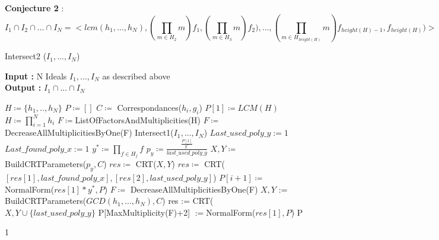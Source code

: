 \documentclass{article}
\begin{document}
\textbf{Conjecture 2} : \[I_{1}\cap I_{2}\cap\dots\cap I_{N} = <lcm(h_{1},\dots,h_{N}),(\prod_{m \in H_{2}} m)f_{1},(\prod_{m \in H_{3}} m)f_{2}),\dots,(\prod_{m \in H_{height(H)}} m)f_{height(H)-1},f_{height(H)})>\]








\begin{algorithm}
    \caption{Intersect2 ($I_{1},...,I_{N}$)}\label{alg:intersect-2-ideals-diff-gcd}
    \textbf{Input : } N Ideals $I_{1},...,I_{N}$ as described above \\
    \textbf{Output : }$I_{1} \cap ...\cap I_ {N}$
\begin{algorithmic}
    \State $H \coloneqq \{h_{1},..,h_{N}\}$
    \State $P \coloneqq []$
    \State $C \coloneqq $ Correspondances($h_{i},g_{i}$)
    \State $P[1] \coloneqq LCM(H)$
    \State $H \coloneqq \prod^{N}_{i=1} h_{i}$
    \State $F \coloneqq $ListOfFactorsAndMultiplicities(H)
    \State $F \coloneqq $DecreaseAllMultiplicitiesByOne(F)
        \State \Return Intersect1($I_{1},...,I_{N}$)
    \EndIf
    \State $Last\_used\_poly\_y := 1$
    \State $Last\_found\_poly\_x := 1$
        \State $y^{*}\coloneqq \prod_{f \in H_{j}} f$
        \State $p_y\coloneqq \frac{\frac{P[1]}{y^{*}}}{last\_used\_poly\_y}$
        \State $X, Y\coloneqq$ BuildCRTParameters($p_y, C$)
        \State $res \coloneqq $ CRT($X,Y$)
            \State $res \coloneqq $ CRT($[res[1],last\_found\_poly\_x],[res[2],last\_used\_poly\_y]$)
        \EndIf
        \State $P[i+1] \coloneqq $ NormalForm($res[1]*y^{*},P$)
        \State $F \coloneqq $ DecreaseAllMultiplicitiesByOne(F)
    \EndFor
    \State $X,Y$ := BuildCRTParameters($GCD(h_{1},...,h_{N}),C$)
    \State res := CRT($X,Y\cup\{last\_used\_poly\_y\}$
    \State P[MaxMultiplicity(F)+2] $:= $NormalForm($res[1],P$)
    \State \Return P

1\end{algorithmic}
\end{algorithm}
\nocite{*}
\printbibliography
\end{document}
